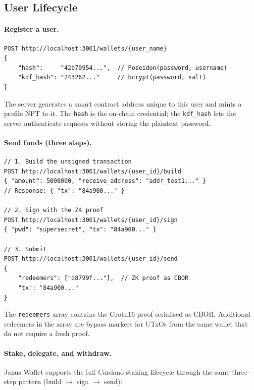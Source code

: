 \subsection*{User Lifecycle}

\paragraph{Register a user.}

\begin{verbatim}
POST http://localhost:3001/wallets/{user_name}
{
    "hash":     "42b79954...",  // Poseidon(password, username)
    "kdf_hash": "243262..."     // bcrypt(password, salt)
}
\end{verbatim}

The server generates a smart contract address unique to this user and mints a profile NFT to it. The \texttt{hash} is the on-chain credential; the \texttt{kdf\_hash} lets the server authenticate requests without storing the plaintext password.

\paragraph{Send funds (three steps).}

\begin{verbatim}
// 1. Build the unsigned transaction
POST http://localhost:3001/wallets/{user_id}/build
{ "amount": 5000000, "receive_address": "addr_test1..." }
// Response: { "tx": "84a900..." }

// 2. Sign with the ZK proof
POST http://localhost:3001/wallets/{user_id}/sign
{ "pwd": "supersecret", "tx": "84a900..." }

// 3. Submit
POST http://localhost:3001/wallets/{user_id}/send
{
    "redeemers": ["d8799f..."],  // ZK proof as CBOR
    "tx": "84a900..."
}
\end{verbatim}

The \texttt{redeemers} array contains the Groth16 proof serialised as CBOR. Additional redeemers in the array are bypass markers for UTxOs from the same wallet that do not require a fresh proof.

\paragraph{Stake, delegate, and withdraw.}

Janus Wallet supports the full Cardano staking lifecycle through the same three-step pattern (build $\to$ sign $\to$ send):

